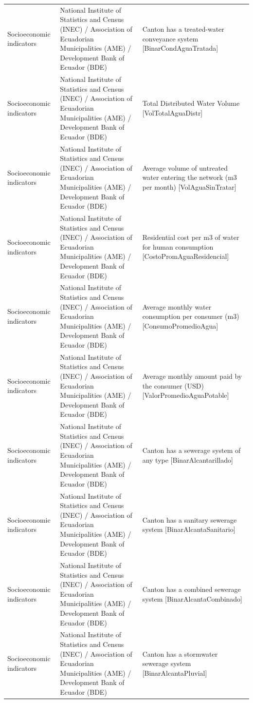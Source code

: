 \documentclass[10pt,a4paper]{article}
\begin{document}
\begin{longtable}{@{}>{\raggedright\arraybackslash}p{3.5cm}>{\raggedright\arraybackslash}p{5.6cm}>{\raggedright\arraybackslash}p{\dimexpr\textwidth-9.1cm-4\tabcolsep\relax}@{}}
Socioeconomic indicators & National Institute of Statistics and Census (INEC) / Association of Ecuadorian Municipalities (AME) / Development Bank of Ecuador (BDE) & Canton has a treated-water conveyance system [BinarCondAguaTratada]\\
Socioeconomic indicators & National Institute of Statistics and Census (INEC) / Association of Ecuadorian Municipalities (AME) / Development Bank of Ecuador (BDE) & Total Distributed Water Volume [VolTotalAguaDistr]\\
Socioeconomic indicators & National Institute of Statistics and Census (INEC) / Association of Ecuadorian Municipalities (AME) / Development Bank of Ecuador (BDE) & Average volume of untreated water entering the network (m3 per month) [VolAguaSinTratar]\\
Socioeconomic indicators & National Institute of Statistics and Census (INEC) / Association of Ecuadorian Municipalities (AME) / Development Bank of Ecuador (BDE) & Residential cost per m3 of water for human consumption [CostoPromAguaResidencial]\\
Socioeconomic indicators & National Institute of Statistics and Census (INEC) / Association of Ecuadorian Municipalities (AME) / Development Bank of Ecuador (BDE) & Average monthly water consumption per consumer (m3) [ConsumoPromedioAgua]\\
Socioeconomic indicators & National Institute of Statistics and Census (INEC) / Association of Ecuadorian Municipalities (AME) / Development Bank of Ecuador (BDE) & Average monthly amount paid by the consumer (USD) [ValorPromedioAguaPotable]\\
Socioeconomic indicators & National Institute of Statistics and Census (INEC) / Association of Ecuadorian Municipalities (AME) / Development Bank of Ecuador (BDE) & Canton has a sewerage system of any type [BinarAlcantarillado]\\
Socioeconomic indicators & National Institute of Statistics and Census (INEC) / Association of Ecuadorian Municipalities (AME) / Development Bank of Ecuador (BDE) & Canton has a sanitary sewerage system [BinarAlcantaSanitario]\\
Socioeconomic indicators & National Institute of Statistics and Census (INEC) / Association of Ecuadorian Municipalities (AME) / Development Bank of Ecuador (BDE) & Canton has a combined sewerage system [BinarAlcantaCombinado]\\
Socioeconomic indicators & National Institute of Statistics and Census (INEC) / Association of Ecuadorian Municipalities (AME) / Development Bank of Ecuador (BDE) & Canton has a stormwater sewerage system [BinarAlcantaPluvial]\\

\end{longtable}
\end{document}

